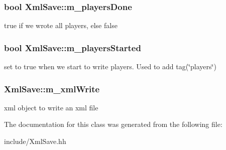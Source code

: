 \subsubsection[{m\+\_\+players\+Done}]{\setlength{\rightskip}{0pt plus 5cm}bool Xml\+Save\+::m\+\_\+players\+Done\hspace{0.3cm}{\ttfamily [private]}}\label{class_xml_save_a95ea43610318f8de62b9e056c26859c2}
true if we wrote all players, else false \hypertarget{class_xml_save_a8f2184f264a26945bb89eaa0b4e1d1c3}{}
\subsubsection[{m\+\_\+players\+Started}]{\setlength{\rightskip}{0pt plus 5cm}bool Xml\+Save\+::m\+\_\+players\+Started\hspace{0.3cm}{\ttfamily [private]}}\label{class_xml_save_a8f2184f264a26945bb89eaa0b4e1d1c3}
set to true when we start to write players. Used to add tag(\char`\"{}players\char`\"{}) \hypertarget{class_xml_save_a56f35c6efd7b1a1e2e795bb53dbda194}{}
\subsubsection[{m\+\_\+xml\+Write}]{ Xml\+Save\+::m\+\_\+xml\+Write\hspace{0.3cm}{\ttfamily [private]}}\label{class_xml_save_a56f35c6efd7b1a1e2e795bb53dbda194}
xml object to write an xml file 

The documentation for this class was generated from the following file\+:\begin{DoxyCompactItemize}
\item 
include/Xml\+Save.\+hh\end{DoxyCompactItemize}
